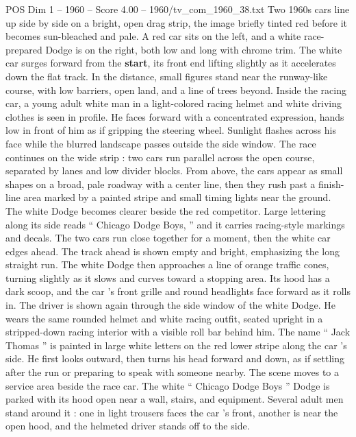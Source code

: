 \begin{textsample}{POS Dim 1 – 1960 – Score 4.00 – 1960/tv\_com\_1960\_38.txt}  \label{ex:f1_pos_079}
Two 1960s cars line up side by side on a bright, open drag strip, the image briefly tinted red before it becomes sun-bleached and pale.
A red car sits on the left, and a white race-prepared Dodge is on the right, both low and long with chrome trim.
The white car surges forward from the \textbf{start}, its front end lifting slightly as it accelerates down the flat track.
In the distance, small figures stand near the runway-like course, with low barriers, open land, and a line of trees beyond.
Inside the racing car, a young adult white man in a light-colored racing helmet and white driving clothes is seen in profile.
He faces forward with a concentrated expression, hands low in front of him as if gripping the steering wheel.
Sunlight flashes across his face while the blurred landscape passes outside the side window.
The race continues on the wide strip : two cars run parallel across the open course, separated by lanes and low divider blocks.
From above, the cars appear as small shapes on a broad, pale roadway with a center line, then they rush past a finish-line area marked by a painted stripe and small timing lights near the ground.
The white Dodge becomes clearer beside the red competitor.
Large lettering along its side reads “ Chicago Dodge Boys, ” and it carries racing-style markings and decals.
The two cars run close together for a moment, then the white car edges ahead.
The track ahead is shown empty and bright, emphasizing the long straight run.
The white Dodge then approaches a line of orange traffic cones, turning slightly as it slows and curves toward a stopping area.
Its hood has a dark scoop, and the car ’s front grille and round headlights face forward as it rolls in.
The driver is shown again through the side window of the white Dodge.
He wears the same rounded helmet and white racing outfit, seated upright in a stripped-down racing interior with a visible roll bar behind him.
The name “ Jack Thomas ” is painted in large white letters on the red lower stripe along the car ’s side.
He first looks outward, then turns his head forward and down, as if settling after the run or preparing to speak with someone nearby.
The scene moves to a service area beside the race car.
The white “ Chicago Dodge Boys ” Dodge is parked with its hood open near a wall, stairs, and equipment.
Several adult men stand around it : one in light trousers faces the car ’s front, another is near the open hood, and the helmeted driver stands off to the side.

\end{textsample}
